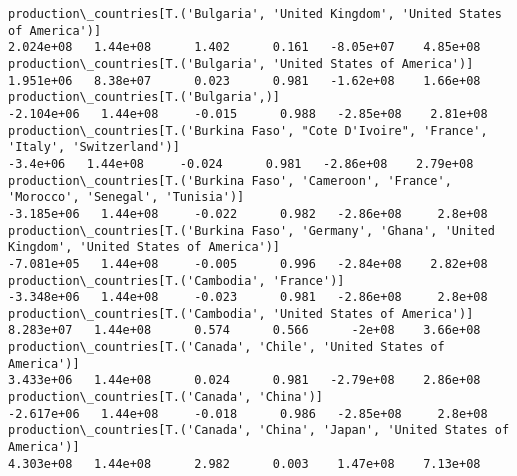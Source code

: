 \documentclass[11pt]{article}
\begin{document}
\begin{Verbatim}[commandchars=\\\{\}]
production\_countries[T.('Bulgaria', 'United Kingdom', 'United States of America')]                                                                                                     2.024e+08   1.44e+08      1.402      0.161   -8.05e+07    4.85e+08
production\_countries[T.('Bulgaria', 'United States of America')]                                                                                                                       1.951e+06   8.38e+07      0.023      0.981   -1.62e+08    1.66e+08
production\_countries[T.('Bulgaria',)]                                                                                                                                                 -2.104e+06   1.44e+08     -0.015      0.988   -2.85e+08    2.81e+08
production\_countries[T.('Burkina Faso', "Cote D'Ivoire", 'France', 'Italy', 'Switzerland')]                                                                                             -3.4e+06   1.44e+08     -0.024      0.981   -2.86e+08    2.79e+08
production\_countries[T.('Burkina Faso', 'Cameroon', 'France', 'Morocco', 'Senegal', 'Tunisia')]                                                                                       -3.185e+06   1.44e+08     -0.022      0.982   -2.86e+08     2.8e+08
production\_countries[T.('Burkina Faso', 'Germany', 'Ghana', 'United Kingdom', 'United States of America')]                                                                            -7.081e+05   1.44e+08     -0.005      0.996   -2.84e+08    2.82e+08
production\_countries[T.('Cambodia', 'France')]                                                                                                                                        -3.348e+06   1.44e+08     -0.023      0.981   -2.86e+08     2.8e+08
production\_countries[T.('Cambodia', 'United States of America')]                                                                                                                       8.283e+07   1.44e+08      0.574      0.566      -2e+08    3.66e+08
production\_countries[T.('Canada', 'Chile', 'United States of America')]                                                                                                                3.433e+06   1.44e+08      0.024      0.981   -2.79e+08    2.86e+08
production\_countries[T.('Canada', 'China')]                                                                                                                                           -2.617e+06   1.44e+08     -0.018      0.986   -2.85e+08     2.8e+08
production\_countries[T.('Canada', 'China', 'Japan', 'United States of America')]                                                                                                       4.303e+08   1.44e+08      2.982      0.003    1.47e+08    7.13e+08

\end{Verbatim}
\end{document}
